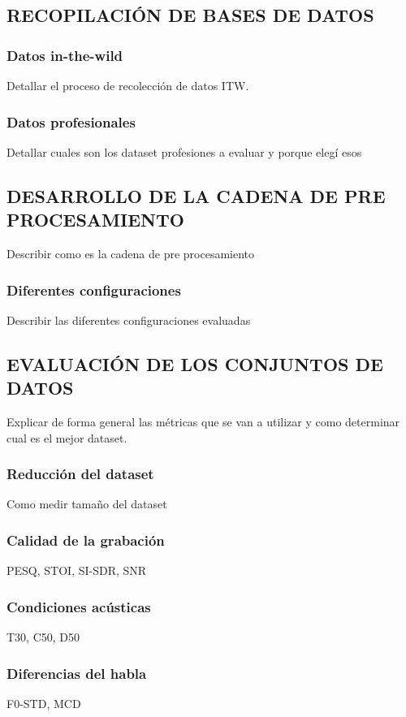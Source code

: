 \subsection{RECOPILACIÓN DE BASES DE DATOS}

\subsubsection{Datos in-the-wild}
Detallar el proceso de recolección de datos ITW.

\subsubsection{Datos profesionales}
Detallar cuales son los dataset profesiones a evaluar y porque elegí esos

\subsection{DESARROLLO DE LA CADENA DE PRE PROCESAMIENTO}
Describir como es la cadena de pre procesamiento

\subsubsection{Diferentes configuraciones}
Describir las diferentes configuraciones evaluadas

\subsection{EVALUACIÓN DE LOS CONJUNTOS DE DATOS}
Explicar de forma general las métricas que se van a utilizar y como determinar cual es el mejor dataset.

\subsubsection{Reducción del dataset}
Como medir tamaño del dataset

\subsubsection{Calidad de la grabación}
PESQ, STOI, SI-SDR, SNR

\subsubsection{Condiciones acústicas}
T30, C50, D50

\subsubsection{Diferencias del habla}
F0-STD, MCD

